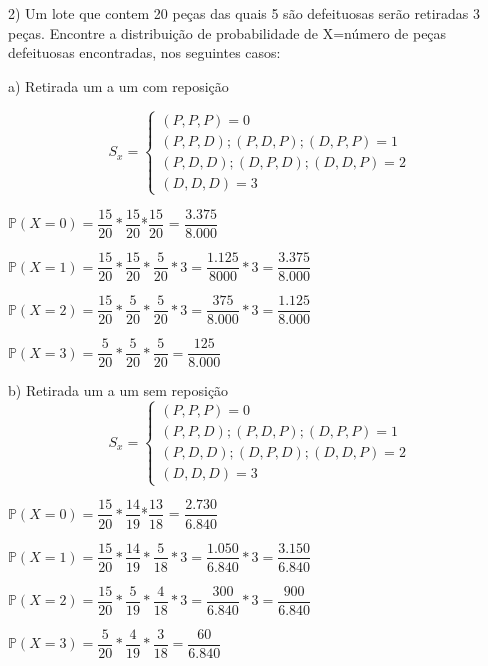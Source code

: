 \documentclass[12pt,a4paper]{article}
\begin{document}
\vspace{1cm}
2) Um lote que contem 20 peças das quais 5 são defeituosas serão retiradas 3 peças. Encontre a distribuição de probabilidade de X=número de peças defeituosas encontradas, nos seguintes casos:

a) Retirada um a um com reposição
\begin{center}
\[
S_{x} =
\begin{cases}
(P,P,P) = 0 \\
(P,P,D);(P,D,P);(D,P,P) = 1\\
(P,D,D);(D,P,D);(D,D,P) = 2\\
(D,D,D) = 3
\end{cases}
\]

\vspace{0.5cm}
$\mathbb{P}(X=0) = \dfrac{15}{20}*\dfrac{15}{20}$*$\dfrac{15}{20}$ = $\dfrac{3.375}{8.000}$

\vspace{0.5cm}
$\mathbb{P}(X=1) = \dfrac{15}{20}*\dfrac{15}{20}*\dfrac{5}{20}*3 = \dfrac{1.125}{8000}*3 = \dfrac{3.375}{8.000}$

\vspace{0.5cm}
$\mathbb{P}(X=2) = \dfrac{15}{20}*\dfrac{5}{20}*\dfrac{5}{20}*3 = \dfrac{375}{8.000}*3 = \dfrac{1.125}{8.000}$

\vspace{0.5cm}
$\mathbb{P}(X=3) = \dfrac{5}{20}*\dfrac{5}{20}*\dfrac{5}{20} = \dfrac{125}{8.000}$
\end{center}

\vspace{1cm}
b) Retirada um a um sem reposição
\[
S_{x} =
\begin{cases}
(P,P,P) = 0 \\
(P,P,D);(P,D,P);(D,P,P) = 1\\
(P,D,D);(D,P,D);(D,D,P) = 2\\
(D,D,D) = 3
\end{cases}
\]
\begin{center}
\vspace{0.5cm}
$\mathbb{P}(X=0) = \dfrac{15}{20}*\dfrac{14}{19}$*$\dfrac{13}{18}$ = $\dfrac{2.730}{6.840}$

\vspace{0.5cm}
$\mathbb{P}(X=1) = \dfrac{15}{20}*\dfrac{14}{19}*\dfrac{5}{18}*3 = \dfrac{1.050}{6.840}*3 = \dfrac{3.150}{6.840}$

\vspace{0.5cm}
$\mathbb{P}(X=2) = \dfrac{15}{20}*\dfrac{5}{19}*\dfrac{4}{18}*3 = \dfrac{300}{6.840}*3 = \dfrac{900}{6.840}$

\vspace{0.5cm}
$\mathbb{P}(X=3) = \dfrac{5}{20}*\dfrac{4}{19}*\dfrac{3}{18} = \dfrac{60}{6.840}$
\end{center}
\end{document}
